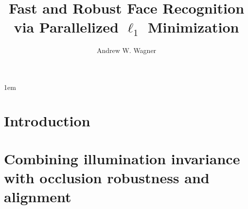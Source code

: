 \documentclass[draftthesis,tocnosub,noragright,centerchapter,12pt]{uiucecethesis09}
\title{Fast and Robust Face Recognition \\
		via Parallelized $\ell_1$ Minimization}
\author{Andrew W. Wagner}
\begin{document}

\maketitle

\parindent 1em%

\frontmatter

\begin{abstract}
 
\end{abstract}


%

\tableofcontents





\mainmatter

\chapter{Introduction}
\label{chap:introduction}


\chapter{Combining illumination invariance with occlusion robustness and alignment}
\label{chap:cvpr}

\end{document}
